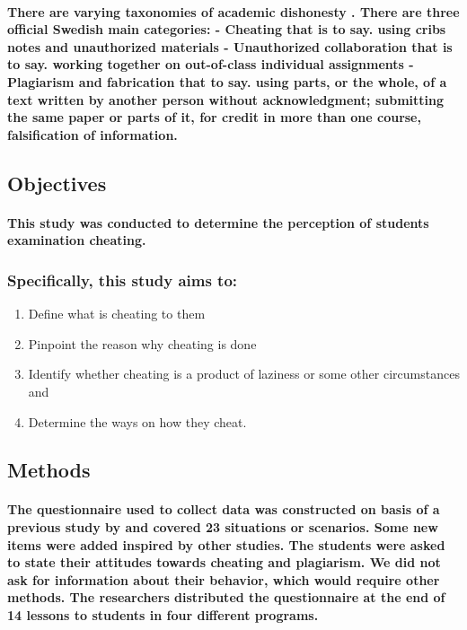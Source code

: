 \documentclass[11pt]{article}
\begin{document}
	 \paragraph{ \textmd{There are varying  taxonomies of academic dishonesty \cite{DUMMY:2}. There are three official Swedish main categories: - Cheating that is to say. using cribs notes and unauthorized materials - Unauthorized collaboration that is to say. working together on out-of-class individual assignments - Plagiarism and fabrication that to say. using parts, or the whole, of a text written by another person without acknowledgment; submitting the same paper or parts of it, for credit in more than one course, falsification of information.}}
	 
	 \subsection{\textbf{Objectives}}
	   \paragraph{\textmd{This study was conducted to determine the perception of students examination cheating.}}
	   
	   \subsubsection{\textbf{Specifically, this study aims to:}}
	   
	   \begin{enumerate}
	   
	   \item Define what is cheating to them
	   \item Pinpoint the reason why cheating is done
	   \item Identify whether cheating is a product of laziness or some other circumstances and 
	   \item Determine the ways on how they cheat.
	           
	   \end{enumerate}
	  
	      
	   
	   \subsection{\textbf{Methods}}
	   \paragraph{\textmd{The questionnaire used to collect data was constructed on basis of a previous study by \cite{DUMMY:1} and covered 23 situations or scenarios. Some new items were added inspired by other studies. The students were asked to state their attitudes towards cheating and plagiarism. We did not ask for information about their behavior, which would require other methods. The researchers distributed the questionnaire at the end of 14 lessons to students in four different programs.}}
	   
\end{document}
